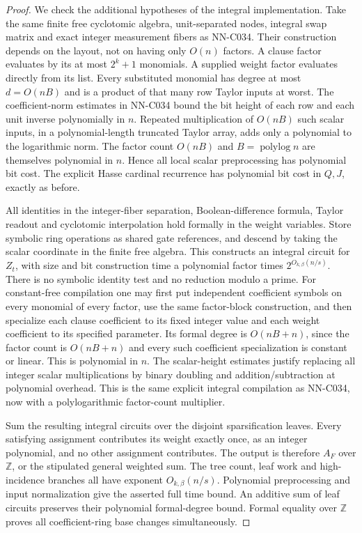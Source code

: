 \begin{proof}
We check the additional hypotheses of the integral implementation. Take the same finite free cyclotomic algebra, unit-separated nodes, integral swap matrix and exact integer measurement fibers as NN-C034. Their construction depends on the layout, not on having only $O(n)$ factors. A clause factor evaluates by its at most $2^k+1$ monomials. A supplied weight factor evaluates directly from its list. Every substituted monomial has degree at most $d=O(nB)$ and is a product of that many row Taylor inputs at worst. The coefficient-norm estimates in NN-C034 bound the bit height of each row and each unit inverse polynomially in $n$. Repeated multiplication of $O(nB)$ such scalar inputs, in a polynomial-length truncated Taylor array, adds only a polynomial to the logarithmic norm. The factor count $O(nB)$ and $B=\operatorname{polylog}n$ are themselves polynomial in $n$. Hence all local scalar preprocessing has polynomial bit cost. The explicit Hasse cardinal recurrence has polynomial bit cost in $Q,J$, exactly as before.

All identities in the integer-fiber separation, Boolean-difference formula, Taylor readout and cyclotomic interpolation hold formally in the weight variables. Store symbolic ring operations as shared gate references, and descend by taking the scalar coordinate in the finite free algebra. This constructs an integral circuit for $Z_t$, with size and bit construction time a polynomial factor times $2^{O_{k,\beta}(n/s)}$. There is no symbolic identity test and no reduction modulo a prime. For constant-free compilation one may first put independent coefficient symbols on every monomial of every factor, use the same factor-block construction, and then specialize each clause coefficient to its fixed integer value and each weight coefficient to its specified parameter. Its formal degree is $O(nB+n)$, since the factor count is $O(nB+n)$ and every such coefficient specialization is constant or linear. This is polynomial in $n$. The scalar-height estimates justify replacing all integer scalar multiplications by binary doubling and addition/subtraction at polynomial overhead. This is the same explicit integral compilation as NN-C034, now with a polylogarithmic factor-count multiplier.

Sum the resulting integral circuits over the disjoint sparsification leaves. Every satisfying assignment contributes its weight exactly once, as an integer polynomial, and no other assignment contributes. The output is therefore $A_F$ over $\mathbb Z$, or the stipulated general weighted sum. The tree count, leaf work and high-incidence branches all have exponent $O_{k,\beta}(n/s)$. Polynomial preprocessing and input normalization give the asserted full time bound. An additive sum of leaf circuits preserves their polynomial formal-degree bound. Formal equality over $\mathbb Z$ proves all coefficient-ring base changes simultaneously.


\end{proof}
